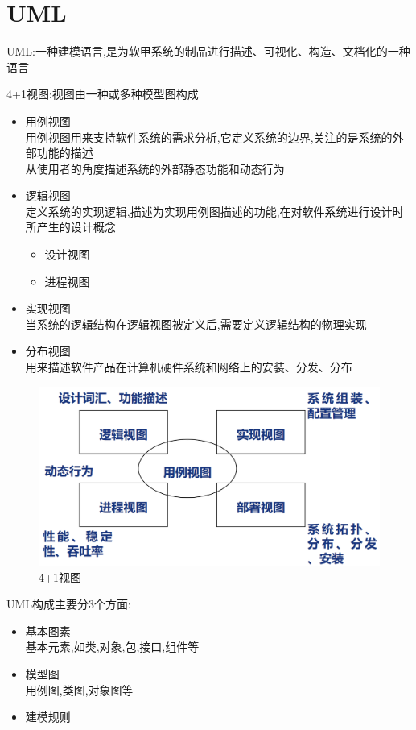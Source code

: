 \documentclass[UTF8,a4paper]{ctexart}
\begin{document}
\section{UML}
UML:一种建模语言,是为软甲系统的制品进行描述、可视化、构造、文档化的一种语言

4+1视图:视图由一种或多种模型图构成
\begin{itemize}
  \item 用例视图\\
  用例视图用来支持软件系统的需求分析,它定义系统的边界,关注的是系统的外部功能的描述\\
  从使用者的角度描述系统的外部静态功能和动态行为
  \item 逻辑视图\\
  定义系统的实现逻辑,描述为实现用例图描述的功能,在对软件系统进行设计时所产生的设计概念
  \begin{itemize}
    \item 设计视图
    \item 进程视图
  \end{itemize}
  \item 实现视图\\
  当系统的逻辑结构在逻辑视图被定义后,需要定义逻辑结构的物理实现
  \item 分布视图\\
  用来描述软件产品在计算机硬件系统和网络上的安装、分发、分布
\end{itemize}

\begin{figure}[H]
  \centering
  \includegraphics[scale = 0.3]{assets/SoftwareEngineering_7aecd.png}
  \caption{4+1视图}
\end{figure}

UML构成主要分3个方面:
\begin{itemize}
  \item 基本图素\\
  基本元素,如类,对象,包,接口,组件等
  \item 模型图\\
  用例图,类图,对象图等
  \item 建模规则
\end{itemize}
\end{document}
